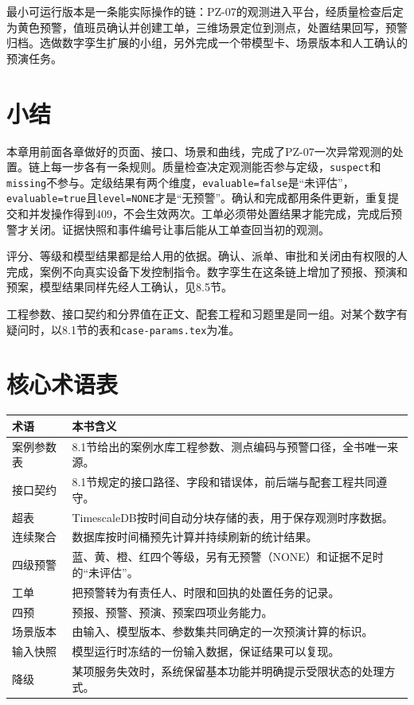 最小可运行版本是一条能实际操作的链：PZ-07的观测进入平台，经质量检查后定为黄色预警，值班员确认并创建工单，三维场景定位到测点，处置结果回写，预警归档。选做数字孪生扩展的小组，另外完成一个带模型卡、场景版本和人工确认的预演任务。

\section*{小结}

本章用前面各章做好的页面、接口、场景和曲线，完成了PZ-07一次异常观测的处置。链上每一步各有一条规则。质量检查决定观测能否参与定级，\texttt{suspect}和\texttt{missing}不参与。定级结果有两个维度，\texttt{evaluable=false}是“未评估”，\texttt{evaluable=true}且\texttt{level=NONE}才是“无预警”。确认和完成都用条件更新，重复提交和并发操作得到409，不会生效两次。工单必须带处置结果才能完成，完成后预警才关闭。证据快照和事件编号让事后能从工单查回当初的观测。

评分、等级和模型结果都是给人用的依据。确认、派单、审批和关闭由有权限的人完成，案例不向真实设备下发控制指令。数字孪生在这条链上增加了预报、预演和预案，模型结果同样先经人工确认，见8.5节。

工程参数、接口契约和分界值在正文、配套工程和习题里是同一组。对某个数字有疑问时，以8.1节的表和\texttt{case-params.tex}为准。

\section*{核心术语表}

\begin{longtable}{p{2.6cm}p{10.0cm}}
\toprule
术语 & 本书含义 \\
\midrule
案例参数表 & 8.1节给出的案例水库工程参数、测点编码与预警口径，全书唯一来源。 \\
接口契约 & 8.1节规定的接口路径、字段和错误体，前后端与配套工程共同遵守。 \\
超表 & TimescaleDB按时间自动分块存储的表，用于保存观测时序数据。 \\
连续聚合 & 数据库按时间桶预先计算并持续刷新的统计结果。 \\
四级预警 & 蓝、黄、橙、红四个等级，另有无预警（NONE）和证据不足时的“未评估”。 \\
工单 & 把预警转为有责任人、时限和回执的处置任务的记录。 \\
四预 & 预报、预警、预演、预案四项业务能力。 \\
场景版本 & 由输入、模型版本、参数集共同确定的一次预演计算的标识。 \\
输入快照 & 模型运行时冻结的一份输入数据，保证结果可以复现。 \\
降级 & 某项服务失效时，系统保留基本功能并明确提示受限状态的处理方式。 \\
\bottomrule
\end{longtable}

